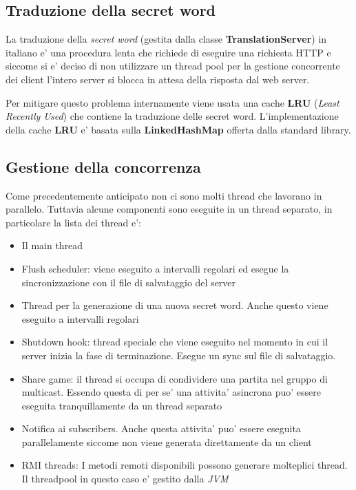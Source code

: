 \subsection{Traduzione della secret word}

La traduzione della \emph{secret word} (gestita dalla classe \textbf{TranslationServer}) in italiano e' una procedura lenta che richiede di eseguire una richiesta HTTP e siccome si e' deciso di non utilizzare un thread pool per la gestione concorrente dei client l'intero server si blocca in attesa della risposta dal web server.

Per mitigare questo problema internamente viene usata una cache \textbf{LRU} (\emph{Least Recently Used}) che contiene la traduzione delle secret word. L'implementazione della cache \textbf{LRU} e' basata sulla \textbf{LinkedHashMap} offerta dalla standard library.

\subsection{Gestione della concorrenza}

Come precedentemente anticipato non ci sono molti thread che lavorano in parallelo. Tuttavia alcune componenti sono eseguite in un thread separato, in particolare la lista dei thread e':
\begin{itemize}
	\item Il main thread
	\item Flush scheduler: viene eseguito a intervalli regolari ed esegue la sincronizzazione con il file di salvataggio del server
	\item Thread per la generazione di una nuova secret word. Anche questo viene eseguito a intervalli regolari
	\item Shutdown hook: thread speciale che viene eseguito nel momento in cui il server inizia la fase di terminazione. Esegue un sync sul file di salvataggio.
	\item Share game: il thread si occupa di condividere una partita nel gruppo di multicast. Essendo questa di per se' una attivita' asincrona puo' essere eseguita tranquillamente da un thread separato
	\item Notifica ai subscribers. Anche questa attivita' puo' essere eseguita parallelamente siccome non viene generata direttamente da un client
	\item RMI threads: I metodi remoti disponibili possono generare molteplici thread. Il threadpool in questo caso e' gestito dalla \emph{JVM}
\end{itemize}

